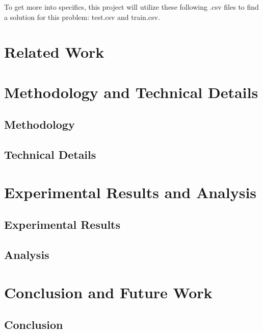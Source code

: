 \documentclass[12pt]{APA}
\begin{document}
To get more into specifics, this project will utilize these following .csv files to find a solution for this problem: test.csv and train.csv.

\newpage



\section{Related Work}


\newpage



\section{Methodology and Technical Details}

\subsection{Methodology}

\subsection{Technical Details}

\newpage



\section{Experimental Results and Analysis}

\subsection{Experimental Results}

\subsection{Analysis}


\newpage

\section{Conclusion and Future Work}

\subsection{Conclusion}
\end{document}
